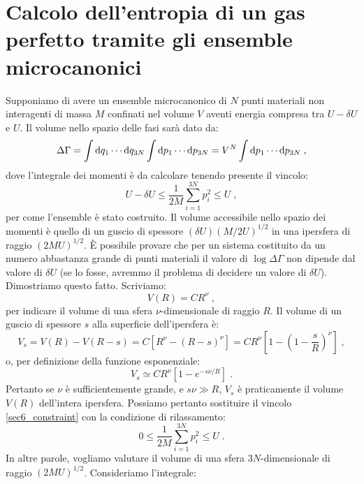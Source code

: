 \section{Calcolo dell'entropia di un gas perfetto tramite gli ensemble microcanonici}
Supponiamo di avere un ensemble microcanonico di $N$ punti materiali non interagenti di massa $M$ confinati nel volume $V$ aventi energia compresa tra $U-\delta U$ e $U$. Il volume nello spazio delle fasi sarà dato da:
\begin{equation}
\Delta\Gamma =\int \mathrm{d}{q_1}\cdots \mathrm{d}{q_{3N}}\int\mathrm{d}{p_1}\cdots\mathrm{d}{p_{3N}}=V^N\int\mathrm{d}{p_1}\cdots\mathrm{d}{p_{3N}}\;,
\end{equation}
dove l'integrale dei momenti è da calcolare tenendo presente il vincolo:
\begin{equation}
U-\delta U\le \frac{1}{2M}\sum_{i=1}^{3N} p_i^2\le U\;, \label{sec6_constraint}
\end{equation}
per come l'ensemble è stato costruito. Il volume accessibile nello spazio dei momenti è quello di un guscio di spessore $(\delta U)(M/2U)^{1/2}$ in una ipersfera di raggio $(2MU)^{1/2}$. È possibile provare che per un sistema costituito da un numero abbastanza grande di punti materiali il valore di $\log\Delta\Gamma$ non dipende dal valore di $\delta U$ (se lo fosse, avremmo il problema di decidere un valore di $\delta U$). Dimostriamo questo fatto. Scriviamo:
\begin{equation}
V(R)=CR^{\nu}\;,
\end{equation}
per indicare il volume di una sfera $\nu$-dimensionale di raggio $R$. Il volume di un guscio di spessore $s$ alla superficie dell'ipersfera è:
\begin{equation}
V_s=V(R)-V(R-s)=C[R^{\nu}-(R-s)^{\nu}]=CR^{\nu}\left[1-\left(1-\frac{s}{R}\right)^{\nu}\right]\;,
\end{equation}
o, per definizione della funzione esponenziale:
\begin{equation}
V_s\simeq CR^{\nu}[1-e^{-s\nu/R}]\;.
\end{equation}
Pertanto se $\nu$ è sufficientemente grande, e $s\nu\gg R$, $V_s$ è praticamente il volume $V(R)$ dell'intera ipersfera. Possiamo pertanto sostituire il vincolo \eqref{sec6_constraint} con la condizione di rilassamento:
\begin{equation}
0\le \frac{1}{2M}\sum_{i=1}^{3N} p_i^2\le U\;.
\end{equation}
In altre parole, vogliamo valutare il volume di una sfera $3N$-dimensionale di raggio $(2MU)^{1/2}$. Consideriamo l'integrale:
